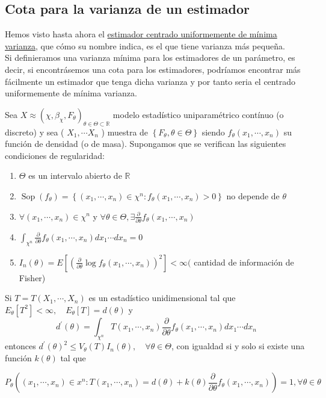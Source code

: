 \subsection{Cota para la varianza de un estimador}
Hemos visto hasta ahora el \underline{estimador centrado uniformemente de
  mínima varianza}, que cómo su nombre indica, es el que tiene varianza más
pequeña. \\ Si definieramos una varianza mínima para los estimadores de un
parámetro, es decir, si encontrásemos una cota para los estimadores, podríamos
encontrar más fácilmente un estimador que tenga dicha varianza y por tanto
seria el centrado uniformemente de mínima varianza.
\begin{definición}
Sea $X \approx\left(\chi, \beta_{\chi}, F_{\theta}\right)_{\theta \in \Theta \subset \mathbb{R}}$ modelo estadístico uniparamétrico contínuo (o discreto) y sea ( $X_{1}, \cdots X_{n}$ ) muestra de $\left\{F_{\theta}, \theta \in \Theta\right\}$ siendo $f_{\theta}\left(x_{1}, \cdots, x_{n}\right)$ su función de densidad (o de masa). Supongamos que se verifican las siguientes condiciones de regularidad:
\begin{enumerate}
  \item $\Theta$ es un intervalo abierto de $\mathbb{R}$
  \item $\operatorname{Sop}\left(f_{\theta}\right)=\left\{\left(x_{1}, \cdots, x_{n}\right) \in \chi^{n}: f_{\theta}\left(x_{1}, \cdots, x_{n}\right)>0\right\}$ no depende de $\theta$
  \item $\forall\left(x_{1}, \cdots, x_{n}\right) \in \chi^{n}$ y $\forall \theta \in \Theta, \exists \frac{\partial}{\partial \theta} f_{\theta}\left(x_{1}, \cdots, x_{n}\right)$
  \item $\int_{\chi^{n}} \frac{\partial}{\partial \theta} f_{\theta}\left(x_{1}, \cdots, x_{n}\right) d x_{1} \cdots d x_{n}=0$
  \item $I_{n}(\theta)=E\left[\left(\frac{\partial}{\partial \theta} \log f_{\theta}\left(x_{1}, \cdots, x_{n}\right)\right)^{2}\right]<\infty($ cantidad de información de Fisher)
\end{enumerate}
\end{definición}

\begin{teorema}
  Si $T=T\left(X_{1}, \cdots, X_{n}\right)$ es un estadístico unidimensional tal que $E_{\theta}\left[T^{2}\right]<\infty, \quad E_{\theta}[T]=d(\theta)$ y $$d^{\prime}(\theta)=\int_{\chi^{n}} T\left(x_{1}, \cdots, x_{n}\right) \frac{\partial}{\partial \theta} f_{\theta}\left(x_{1}, \cdots, x_{n}\right) d x_{1} \cdots d x_{n}$$ entonces $d^{\prime}(\theta)^{2} \leq V_{\theta}(T) I_{n}(\theta), \quad \forall \theta \in \Theta$, con igualdad si y solo si existe una función $k(\theta)$ tal que

  $$
    P_{\theta}\left(\left(x_{1}, \cdots, x_{n}\right) \in x^{n}: T\left(x_{1}, \cdots, x_{n}\right)=d(\theta)+k(\theta) \frac{\partial}{\partial \theta} f_{\theta}\left(x_{1}, \cdots, x_{n}\right)\right)=1, \forall \theta \in \theta
  $$
\end{teorema}

